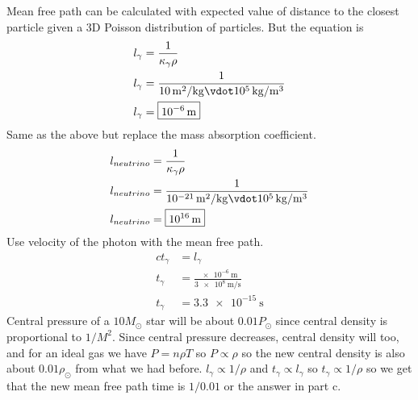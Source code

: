 \documentclass[newpage]{homework}
\begin{document}
\question
\begin{alphaparts}
    \questionpart Mean free path can be calculated with expected value of distance to the closest particle given a 3D Poisson distribution of particles. But the equation is
        \begin{align*}
            l_\gamma    &= \frac{1}{\kappa_\gamma \rho}	\\
            l_\gamma    &= \frac{1}{\SI{10}{\metre^2\per\kilogram} \vdot \SI{e5}{\kilogram\per\metre^3}}	\\
            l_\gamma    &= \boxed{\SI{e-6}{\metre}}
        \end{align*}
    \questionpart Same as the above but replace the mass absorption coefficient.
        \begin{align*}
            l_{neutrino}    &= \frac{1}{\kappa_\gamma \rho}	\\
            l_{neutrino}    &= \frac{1}{\SI{e-21}{\metre^2\per\kilogram} \vdot \SI{e5}{\kilogram\per\metre^3}}	\\
            l_{neutrino}    &= \boxed{\SI{e16}{\metre}}
        \end{align*}
    \questionpart Use velocity of the photon with the mean free path.
        \begin{align*}
            ct_\gamma	&=	l_\gamma	\\
            t_\gamma    &=  \frac{\SI{e-6}{\metre}}{\SI{3e8}{\metre\per\second}}    \\
            t_\gamma    &=	\boxed{\SI{3.3e-15}{\second}}
        \end{align*}
    \questionpart Central pressure of a $10M_\odot$ star will be about $0.01 P_\odot$ since central density is proportional to $1/M^2$. Since central pressure decreases, central density will too, and for an ideal gas we have $P = n\rho T$ so $P \propto \rho$ so the new central density is also about $0.01 \rho_\odot$ from what we had before. $l_\gamma \propto 1/\rho$ and $t_\gamma \propto l_\gamma$ so $t_\gamma \propto 1/\rho$ so we get that the new mean free path time is $1/0.01$ or  the answer in part c.
\end{alphaparts}
\end{document}

